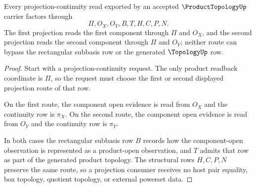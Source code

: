 \begin{theorem}
\label{thm:product-topology-projection-continuity}
Every projection-continuity read exported by an accepted $\ProductTopologyUp$ carrier factors through
$$
\Pi,O_X,O_Y,B,T,H,C,P,N.
$$
The first projection reads the first component through $\Pi$ and $O_X$, and the second projection reads the second component through $\Pi$ and $O_Y$; neither route can bypass the rectangular subbasis row or the generated $\TopologyUp$ row.
\end{theorem}
\begin{proof}
Start with a projection-continuity request. The only product readback coordinate is $\Pi$, so the request must choose the first or second displayed projection route of that row.

On the first route, the component open evidence is read from $O_X$ and the continuity row is $\pi_X$. On the second route, the component open evidence is read from $O_Y$ and the continuity row is $\pi_Y$.

In both cases the rectangular subbasis row $B$ records how the component-open observation is represented as a product-open observation, and $T$ admits that row as part of the generated product topology. The structural rows $H,C,P,N$ preserve the same route, so a projection consumer receives no host pair equality, box topology, quotient topology, or external powerset data.
\end{proof}


